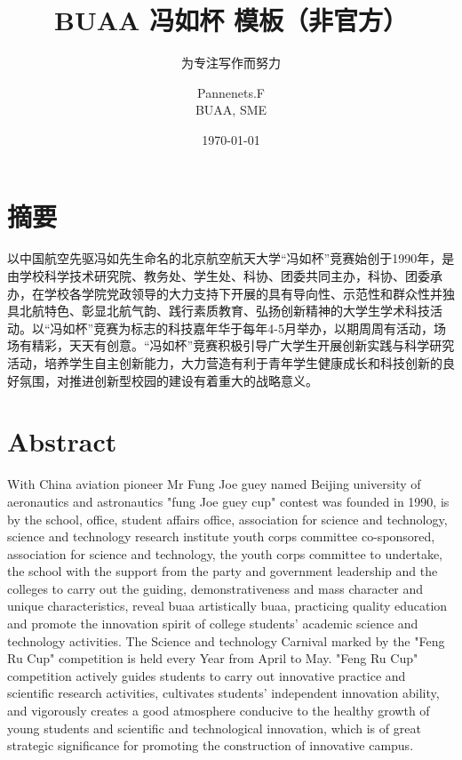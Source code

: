 \documentclass[lang=cn,12pt]{frbpaper}
\title{BUAA 冯如杯 \hologo{LaTeX} 模板（非官方）}
\subtitle{为专注写作而努力}
\author{\Large Pannenets.F \\  \Large{BUAA, SME}}
\date{\today}
\begin{document}
\maketitle

\makeabstract

\section*{摘要}
以中国航空先驱冯如先生命名的北京航空航天大学“冯如杯”竞赛始创于1990年，是由学校科学技术研究院、教务处、学生处、科协、团委共同主办，科协、团委承办，在学校各学院党政领导的大力支持下开展的具有导向性、示范性和群众性并独具北航特色、彰显北航气韵、践行素质教育、弘扬创新精神的大学生学术科技活动。以“冯如杯”竞赛为标志的科技嘉年华于每年4-5月举办，以期周周有活动，场场有精彩，天天有创意。“冯如杯”竞赛积极引导广大学生开展创新实践与科学研究活动，培养学生自主创新能力，大力营造有利于青年学生健康成长和科技创新的良好氛围，对推进创新型校园的建设有着重大的战略意义。

\clearpage


\section*{Abstract}
With China aviation pioneer Mr Fung Joe guey named Beijing university of aeronautics and astronautics "fung Joe guey cup" contest was founded in 1990, is by the school, office, student affairs office, association for science and technology, science and technology research institute youth corps committee co-sponsored, association for science and technology, the youth corps committee to undertake, the school with the support from the party and government leadership and the colleges to carry out the guiding, demonstrativeness and mass character and unique characteristics, reveal buaa artistically buaa, practicing quality education and promote the innovation spirit of college students' academic science and technology activities. The Science and technology Carnival marked by the "Feng Ru Cup" competition is held every Year from April to May. "Feng Ru Cup" competition actively guides students to carry out innovative practice and scientific research activities, cultivates students' independent innovation ability, and vigorously creates a good atmosphere conducive to the healthy growth of young students and scientific and technological innovation, which is of great strategic significance for promoting the construction of innovative campus.
\end{document}
